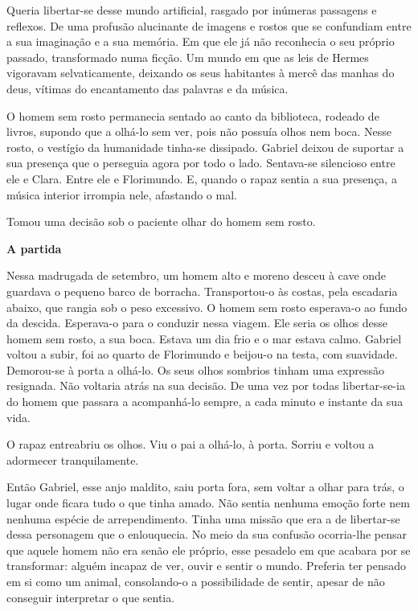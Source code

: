 Queria libertar-se desse mundo artificial, rasgado por inúmeras
passagens e reflexos. De uma profusão alucinante de imagens e rostos que
se confundiam entre a sua imaginação e a sua memória. Em que ele já não
reconhecia o seu próprio passado, transformado numa ficção. Um mundo em
que as leis de Hermes vigoravam selvaticamente, deixando os seus
habitantes à mercê das manhas do deus, vítimas do encantamento das
palavras e da música.

O homem sem rosto permanecia sentado ao canto da biblioteca, rodeado de
livros, supondo que a olhá-lo sem ver, pois não possuía olhos nem boca.
Nesse rosto, o vestígio da humanidade tinha-se dissipado. Gabriel deixou
de suportar a sua presença que o perseguia agora por todo o lado.
Sentava-se silencioso entre ele e Clara. Entre ele e Florimundo. E,
quando o rapaz sentia a sua presença, a música interior irrompia nele,
afastando o mal.

Tomou uma decisão sob o paciente olhar do homem sem rosto.

\vspace*{1.8cm}
\noindent{}\textbf{A partida}

\bigskip

Nessa madrugada de setembro, um homem alto e moreno desceu à cave onde
guardava o pequeno barco de borracha. Transportou-o às costas, pela
escadaria abaixo, que rangia sob o peso excessivo. O homem sem rosto
esperava-o ao fundo da descida. Esperava-o para o conduzir nessa viagem.
Ele seria os olhos desse homem sem rosto, a sua boca. Estava um dia frio
e o mar estava calmo. Gabriel voltou a subir, foi ao quarto de
Florimundo e beijou-o na testa, com suavidade. Demorou-se à porta a
olhá-lo. Os seus olhos sombrios tinham uma expressão resignada. Não
voltaria atrás na sua decisão. De uma vez por todas libertar-se-ia do
homem que passara a acompanhá-lo sempre, a cada minuto e instante da sua
vida.

O rapaz entreabriu os olhos. Viu o pai a olhá-lo, à porta. Sorriu e
voltou a adormecer tranquilamente.

Então Gabriel, esse anjo maldito, saiu porta fora, sem voltar a olhar
para trás, o lugar onde ficara tudo o que tinha amado. Não sentia
nenhuma emoção forte nem nenhuma espécie de arrependimento. Tinha uma
missão que era a de libertar-se dessa personagem que o enlouquecia. No
meio da sua confusão ocorria-lhe pensar que aquele homem não era senão
ele próprio, esse pesadelo em que acabara por se transformar: alguém
incapaz de ver, ouvir e sentir o mundo. Preferia ter pensado em si como
um animal, consolando-o a possibilidade de sentir, apesar de não
conseguir interpretar o que sentia.


